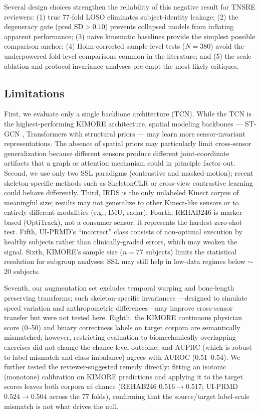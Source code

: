 \documentclass[10pt,journal]{IEEEtran}
\begin{document}
Several design choices strengthen the reliability of this negative result for TNSRE reviewers: (1) true 77-fold LOSO eliminates subject-identity leakage; (2) the degeneracy gate ($\text{pred\_SD} > 0.10$) prevents collapsed models from inflating apparent performance; (3) naive kinematic baselines provide the simplest possible comparison anchor; (4) Holm-corrected sample-level tests ($N=380$) avoid the underpowered fold-level comparisons common in the literature; and (5) the scale ablation and protocol-invariance analyses pre-empt the most likely critiques.

\subsection{Limitations}
\label{sec:limitations}

First, we evaluate only a single backbone architecture (TCN). While the TCN is the highest-performing KIMORE architecture, spatial modeling backbones --- ST-GCN \cite{yan2018stgcn}, Transformers with structural priors --- may learn more sensor-invariant representations. The absence of spatial priors may particularly limit cross-sensor generalization because different sensors produce different joint-coordinate artifacts that a graph or attention mechanism could in principle factor out. Second, we use only two SSL paradigms (contrastive and masked-motion); recent skeleton-specific methods such as SkeletonCLR \cite{thoker2021skeletonclr} or cross-view contrastive learning could behave differently. Third, IRDS is the only unlabeled Kinect corpus of meaningful size; results may not generalize to other Kinect-like sensors or to entirely different modalities (e.g., IMU, radar). Fourth, REHAB246 is marker-based (OptiTrack), not a consumer sensor; it represents the hardest zero-shot test. Fifth, UI-PRMD's ``incorrect'' class consists of non-optimal execution by healthy subjects rather than clinically-graded errors, which may weaken the signal. Sixth, KIMORE's sample size ($n = 77$ subjects) limits the statistical resolution for subgroup analyses; SSL may still help in low-data regimes below $\sim$20 subjects.

Seventh, our augmentation set excludes temporal warping and bone-length preserving transforms; such skeleton-specific invariances \cite{thoker2021skeletonclr}---designed to simulate speed variation and anthropometric differences---may improve cross-sensor transfer but were not tested here. Eighth, the KIMORE continuous physician score (0--50) and binary correctness labels on target corpora are semantically mismatched; however, restricting evaluation to biomechanically overlapping exercises did not change the chance-level outcome, and AUPRC (which is robust to label mismatch and class imbalance) agrees with AUROC (0.51--0.54). We further tested the reviewer-suggested remedy directly: fitting an isotonic (monotone) calibration on KIMORE predictions and applying it to the target scores leaves both corpora at chance (REHAB246 $0.516\!\to\!0.517$; UI-PRMD $0.524\!\to\!0.504$ across the 77 folds), confirming that the source/target label-scale mismatch is not what drives the null.
\end{document}
